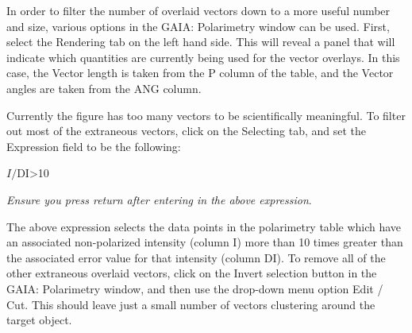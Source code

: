 In order to filter the number of overlaid vectors down to a more useful number and size,
various options in the GAIA: Polarimetry window can be used. First, select the Rendering
tab on the left hand side. This will reveal a panel that will indicate which quantities 
are currently being used for the vector overlays. In this case, the Vector length is taken 
from the P column of the table, and the Vector angles are taken from the ANG column.

Currently the figure has too many vectors to be scientifically meaningful. To filter 
out most of the extraneous vectors, click on the Selecting tab, and set the Expression 
field to be the following:

\begin{terminalv}
$I/$DI>10
\end{terminalv}

\emph{Ensure you press return after entering in the above expression}.

The above expression selects the data points in the polarimetry table which have an 
associated non-polarized intensity (column I) more than 10 times greater than the 
associated error value for that intensity (column DI). To remove all of the other 
extraneous overlaid vectors, click on the Invert selection button in the GAIA: Polarimetry 
window, and then use the drop-down menu option Edit / Cut. This should leave just a 
small number of vectors clustering around the target object. 

